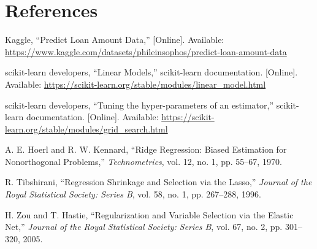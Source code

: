 \documentclass[12pt,a4paper]{article}
\begin{document}
\section{References}\label{sec:references}
\begin{enumerate}[label={[\arabic*]}]
\item Kaggle, ``Predict Loan Amount Data,'' [Online]. Available: \url{https://www.kaggle.com/datasets/phileinsophos/predict-loan-amount-data}
\item scikit-learn developers, ``Linear Models,'' scikit-learn documentation. [Online]. Available: \url{https://scikit-learn.org/stable/modules/linear_model.html}
\item scikit-learn developers, ``Tuning the hyper-parameters of an estimator,'' scikit-learn documentation. [Online]. Available: \url{https://scikit-learn.org/stable/modules/grid_search.html}
\item A. E. Hoerl and R. W. Kennard, ``Ridge Regression: Biased Estimation for Nonorthogonal Problems,'' \textit{Technometrics}, vol. 12, no. 1, pp. 55--67, 1970.
\item R. Tibshirani, ``Regression Shrinkage and Selection via the Lasso,'' \textit{Journal of the Royal Statistical Society: Series B}, vol. 58, no. 1, pp. 267--288, 1996.
\item H. Zou and T. Hastie, ``Regularization and Variable Selection via the Elastic Net,'' \textit{Journal of the Royal Statistical Society: Series B}, vol. 67, no. 2, pp. 301--320, 2005.
\end{enumerate}
\end{document}
